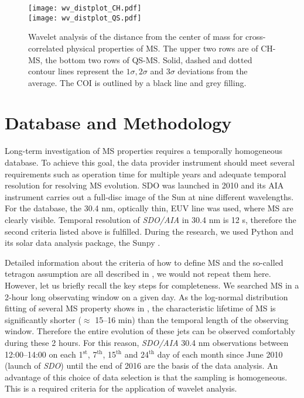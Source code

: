 \documentclass[final,authoryear,5p]{elsarticle}
\begin{document}
\begin{figure*}[t]
	\texttt{[image: wv\_distplot\_CH.pdf]}\\
	\texttt{[image: wv\_distplot\_QS.pdf]}
	\centering
	\caption{Wavelet analysis of the distance from the center of mass for cross-correlated physical properties of MS. The upper two rows are of CH-MS, the bottom two rows of QS-MS. Solid, dashed and dotted contour lines represent the $1\sigma, 2\sigma$ and $3\sigma$ deviations from the average. The COI is outlined by a black line and grey filling.}
	\label{fig02}
\end{figure*}

\section{Database and Methodology}
Long-term investigation of MS properties requires a temporally homogeneous database. To achieve this goal, the data provider instrument should meet several requirements such as operation time for multiple years and adequate temporal resolution for resolving MS evolution. SDO was launched in 2010 and its AIA instrument carries out a full-disc image of the Sun at nine different wavelengths. For the database, the 30.4 nm, optically thin, EUV line was used, where MS are clearly visible. Temporal resolution of \textit{SDO/AIA} in 30.4 nm is 12 s, therefore the second criteria listed above is fulfilled. During the research, we used Python and its solar data analysis package, the Sunpy \citep{mumfort2015}.

Detailed information about the criteria of how to define MS and the so-called tetragon assumption are all described in \cite{kiss2017}, we would not repeat them here. However, let us briefly recall the key steps for completeness. We searched MS in a 2-hour long observating window on a given day. As the log-normal distribution fitting of several MS property shows in \cite{kiss2017}, the characteristic lifetime of MS is significantly shorter ($\approx$ 15--16 min) than the temporal length of the observing window. Therefore the entire evolution of these jets can be observed comfortably during these 2 hours. For this reason, \textit{SDO/AIA} 30.4 nm observations between 12:00--14:00 on each 1$^{\text{st}}$, 7$^{\text{th}}$, 15$^{\text{th}}$ and 24$^{\text{th}}$ day of each month since June 2010 (launch of \textit{SDO}) until the end of 2016 are the basis of the data analysis. An advantage of this choice of data selection is that the sampling is homogeneous. This is a required criteria for the application of wavelet analysis.
 
\end{document}
